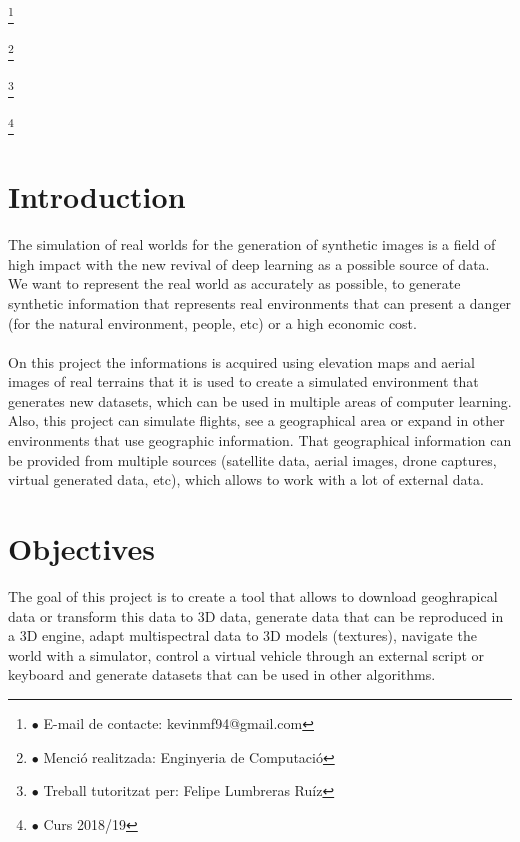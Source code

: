 \documentclass[10pt,a4paper,twocolumn,twoside]{article}
\newcommand\blfootnote[1]{%
  \begingroup
  \renewcommand\thefootnote{}\footnote{#1}%
  \addtocounter{footnote}{-1}%
  \endgroup
}
\begin{document}
\blfootnote{$\bullet$ E-mail de contacte: kevinmf94@gmail.com}
\blfootnote{$\bullet$ Menció realitzada: Enginyeria de Computació}
\blfootnote{$\bullet$ Treball tutoritzat per: Felipe Lumbreras Ruíz}
\blfootnote{$\bullet$ Curs 2018/19}

\vspace{-1cm}
\section{Introduction}
The simulation of real worlds for the generation of synthetic images is a field of high impact with the new revival of deep learning as a possible source of data. We want to represent the real world as accurately as possible, to generate synthetic information that represents real environments that can present a danger (for the natural environment, people, etc) or a high economic cost.
\\
\\
On this project the informations is acquired using elevation maps and aerial images of real terrains that it is used to create a simulated environment that generates new datasets, which can be used in multiple areas of computer learning. Also, this project can simulate flights, see a geographical area or expand in other environments that use geographic information. That geographical information can be provided from multiple sources (satellite data, aerial images, drone captures, virtual generated data, etc), which allows to work with a lot of external data.

\section{Objectives}

The goal of this project is to create a tool that allows to download geoghrapical data or transform this data to 3D data, generate data that can be reproduced in a 3D engine, adapt multispectral data to 3D models (textures), navigate the world with a simulator, control a virtual vehicle through an external script or keyboard and generate datasets that can be used in other algorithms.

\end{document}
